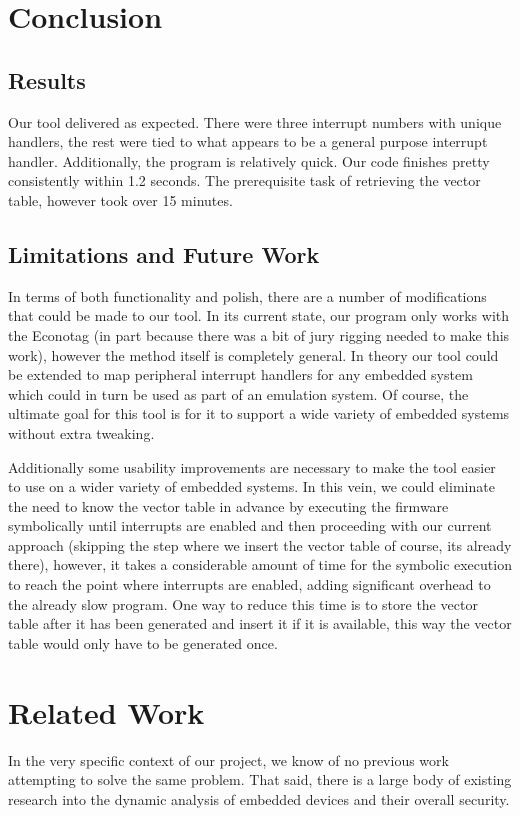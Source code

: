 \documentclass[letterpaper, 10 pt, conference]{ieeeconf}
\begin{document}
\section{Conclusion}
\subsection{Results}
Our tool delivered as expected. There were three interrupt numbers with unique handlers, the rest were tied to what appears to be a general purpose interrupt handler. Additionally, the program is relatively quick. Our code finishes pretty consistently within 1.2 seconds. The prerequisite task of retrieving the vector table, however took over 15 minutes. 

\subsection{Limitations and Future Work}%
In terms of both functionality and polish, there are a number of modifications that could be made to our tool. In its current state, our program only works with the Econotag (in part because there was a bit of jury rigging needed to make this work), however the method itself is completely general. In theory our tool could be extended to map peripheral interrupt handlers for any embedded system which could in turn be used as part of an emulation system. Of course, the ultimate goal for this tool is for it to support a wide variety of embedded systems without extra tweaking. 

Additionally some usability improvements are necessary to make the tool easier to use on a wider variety of embedded systems. In this vein, we could eliminate the need to know the vector table in advance by executing the firmware symbolically until interrupts are enabled and then proceeding with our current approach (skipping the step where we insert the vector table of course, its already there), however, it takes a considerable amount of time for the symbolic execution to reach the point where interrupts are enabled, adding significant overhead to the already slow program. One way to reduce this time is to store the vector table after it has been generated and insert it if it is available, this way the vector table would only have to be generated once.


\section{Related Work} %
In the very specific context of our project, we know of no previous work attempting to solve the same problem. That said, there is a large body of existing research into the dynamic analysis of embedded devices and their overall security.
\end{document}
